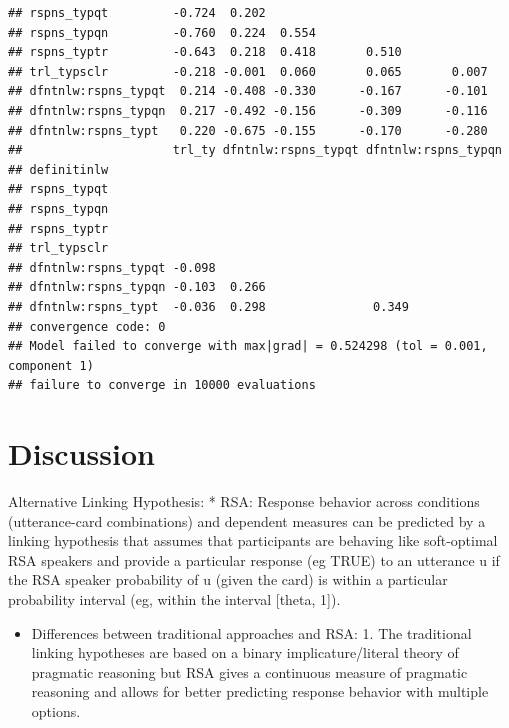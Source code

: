 \documentclass[floatsintext,man]{apa6}
\providecommand{\tightlist}{%
  \setlength{\itemsep}{0pt}\setlength{\parskip}{0pt}}
\theoremstyle{definition}
\theoremstyle{definition}
\theoremstyle{definition}
\theoremstyle{remark}
\begin{document}
\begin{verbatim}
## rspns_typqt         -0.724  0.202                                   
## rspns_typqn         -0.760  0.224  0.554                            
## rspns_typtr         -0.643  0.218  0.418       0.510                
## trl_typsclr         -0.218 -0.001  0.060       0.065       0.007    
## dfntnlw:rspns_typqt  0.214 -0.408 -0.330      -0.167      -0.101    
## dfntnlw:rspns_typqn  0.217 -0.492 -0.156      -0.309      -0.116    
## dfntnlw:rspns_typt   0.220 -0.675 -0.155      -0.170      -0.280    
##                     trl_ty dfntnlw:rspns_typqt dfntnlw:rspns_typqn
## definitinlw                                                       
## rspns_typqt                                                       
## rspns_typqn                                                       
## rspns_typtr                                                       
## trl_typsclr                                                       
## dfntnlw:rspns_typqt -0.098                                        
## dfntnlw:rspns_typqn -0.103  0.266                                 
## dfntnlw:rspns_typt  -0.036  0.298               0.349             
## convergence code: 0
## Model failed to converge with max|grad| = 0.524298 (tol = 0.001, component 1)
## failure to converge in 10000 evaluations
\end{verbatim}

\section{Discussion}\label{discussion}

Alternative Linking Hypothesis: * RSA: Response behavior across
conditions (utterance-card combinations) and dependent measures can be
predicted by a linking hypothesis that assumes that participants are
behaving like soft-optimal RSA speakers and provide a particular
response (eg TRUE) to an utterance u if the RSA speaker probability of u
(given the card) is within a particular probability interval (eg, within
the interval {[}theta, 1{]}).

\begin{itemize}
\tightlist
\item
  Differences between traditional approaches and RSA: 1. The traditional
  linking hypotheses are based on a binary implicature/literal theory of
  pragmatic reasoning but RSA gives a continuous measure of pragmatic
  reasoning and allows for better predicting response behavior with
  multiple options.
\end{itemize}
\end{document}
